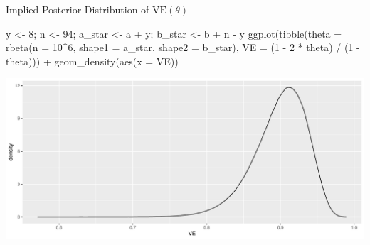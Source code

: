 \documentclass[
  ignorenonframetext,
]{beamer}
\newenvironment{Shaded}{\begin{snugshade}}{\end{snugshade}}
\newcommand{\AttributeTok}[1]{\textcolor[rgb]{0.77,0.63,0.00}{#1}}
\newcommand{\DecValTok}[1]{\textcolor[rgb]{0.00,0.00,0.81}{#1}}
\newcommand{\FunctionTok}[1]{\textcolor[rgb]{0.00,0.00,0.00}{#1}}
\newcommand{\NormalTok}[1]{#1}
\newcommand{\OtherTok}[1]{\textcolor[rgb]{0.56,0.35,0.01}{#1}}
\newcommand{\SpecialCharTok}[1]{\textcolor[rgb]{0.00,0.00,0.00}{#1}}
\begin{document}
\begin{frame}[fragile]{Implied Posterior Distribution of
\(\mbox{VE}\left(\theta\right)\)}
\protect\hypertarget{implied-posterior-distribution-of-mboxveleftthetaright}{}
\begin{Shaded}
\begin{Highlighting}[]
\NormalTok{y }\OtherTok{\textless{}{-}} \DecValTok{8}\NormalTok{; n }\OtherTok{\textless{}{-}} \DecValTok{94}\NormalTok{; a\_star }\OtherTok{\textless{}{-}}\NormalTok{ a }\SpecialCharTok{+}\NormalTok{ y; b\_star }\OtherTok{\textless{}{-}}\NormalTok{ b }\SpecialCharTok{+}\NormalTok{ n }\SpecialCharTok{{-}}\NormalTok{ y}
\FunctionTok{ggplot}\NormalTok{(}\FunctionTok{tibble}\NormalTok{(}\AttributeTok{theta =} \FunctionTok{rbeta}\NormalTok{(}\AttributeTok{n =} \DecValTok{10}\SpecialCharTok{\^{}}\DecValTok{6}\NormalTok{, }\AttributeTok{shape1 =}\NormalTok{ a\_star, }\AttributeTok{shape2 =}\NormalTok{ b\_star),}
              \AttributeTok{VE =}\NormalTok{ (}\DecValTok{1} \SpecialCharTok{{-}} \DecValTok{2} \SpecialCharTok{*}\NormalTok{ theta) }\SpecialCharTok{/}\NormalTok{ (}\DecValTok{1} \SpecialCharTok{{-}}\NormalTok{ theta))) }\SpecialCharTok{+} \FunctionTok{geom\_density}\NormalTok{(}\FunctionTok{aes}\NormalTok{(}\AttributeTok{x =}\NormalTok{ VE))}
\end{Highlighting}
\end{Shaded}

\includegraphics{Slides04_files/figure-beamer/unnamed-chunk-8-1.pdf}
\end{frame}
\end{document}
